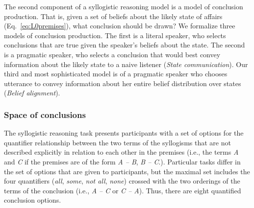 \documentclass[floatsintext, doc]{apa6}
\newcommand{\mht}[1]{{\textcolor{Blue}{[mht: #1]}}}
\begin{document}
The second component of a syllogistic reasoning model is a model of conclusion production. 
That is, given a set of beliefs about the likely state of affairs (Eq.~\ref{eq:L0premises}), what conclusion should be drawn?
We formalize three models of conclusion production.
The first is a literal speaker, who selects conclusions that are true given the speaker's beliefs about the state. 
The second is a pragmatic speaker, who selects a conclusion that would best convey information about the likely state to a naive listener (\emph{State communication}). 
Our third and most sophisticated model is of a pragmatic speaker who chooses utterance to convey information about her entire belief distribution over states (\emph{Belief alignment}). 

\subsubsection{Space of conclusions}

The syllogistic reasoning task presents participants with a set of options for the quantifier relationship between the two terms of the syllogisms that are not described explicitly in relation to each other in the premises (i.e., the terms \emph{A} and \emph{C} if the premises are of the form \emph{A -- B}, \emph{B -- C}.). 
Particular tasks differ in the set of options that are given to participants, but the maximal set includes the four quantifiers  (\emph{all}, \emph{some}, \emph{not all}, \emph{none}) crossed with the two orderings of the terms of the conclusion (i.e., \emph{A -- C} or \emph{C -- A}).
Thus, there are eight quantified conclusion options. 
\end{document}
